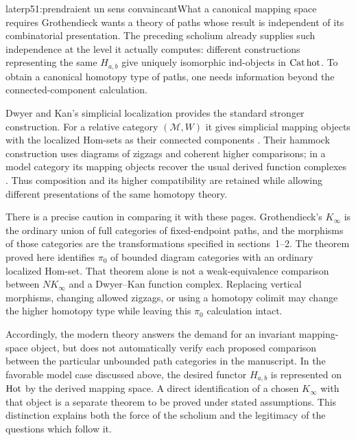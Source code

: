 \begin{dcomment}{later}{p51:prendraient un sens convaincant}{What a canonical mapping space requires}
Grothendieck wants a theory of paths whose result is independent of its combinatorial presentation. The preceding scholium already supplies such independence at the level it actually computes: different constructions representing the same $H_{a,b}$ give uniquely isomorphic ind-objects in $\mathrm{Cat\,hot}$. To obtain a canonical homotopy type of paths, one needs information beyond the connected-component calculation.

Dwyer and Kan's simplicial localization provides the standard stronger construction. For a relative category $(\mathcal M,W)$ it gives simplicial mapping objects with the localized Hom-sets as their connected components \citep[\S2 and Proposition~3.1]{DwyerKan1980Calculating}. Their hammock construction uses diagrams of zigzags and coherent higher comparisons; in a model category its mapping objects recover the usual derived function complexes \citep[Proposition~4.4 and Corollary~4.7]{DwyerKan1980Function}. Thus composition and its higher compatibility are retained while allowing different presentations of the same homotopy theory.

There is a precise caution in comparing it with these pages. Grothendieck's $K_\infty$ is the ordinary union of full categories of fixed-endpoint paths, and the morphisms of those categories are the transformations specified in sections~1--2. The theorem proved here identifies $\pi_0$ of bounded diagram categories with an ordinary localized Hom-set. That theorem alone is not a weak-equivalence comparison between $NK_\infty$ and a Dwyer--Kan function complex. Replacing vertical morphisms, changing allowed zigzags, or using a homotopy colimit may change the higher homotopy type while leaving this $\pi_0$ calculation intact.

Accordingly, the modern theory answers the demand for an invariant mapping-space object, but does not automatically verify each proposed comparison between the particular unbounded path categories in the manuscript. In the favorable model case discussed above, the desired functor $H_{a,b}$ is represented on $\mathrm{Hot}$ by the derived mapping space. A direct identification of a chosen $K_\infty$ with that object is a separate theorem to be proved under stated assumptions. This distinction explains both the force of the scholium and the legitimacy of the questions which follow it.
\end{dcomment}


